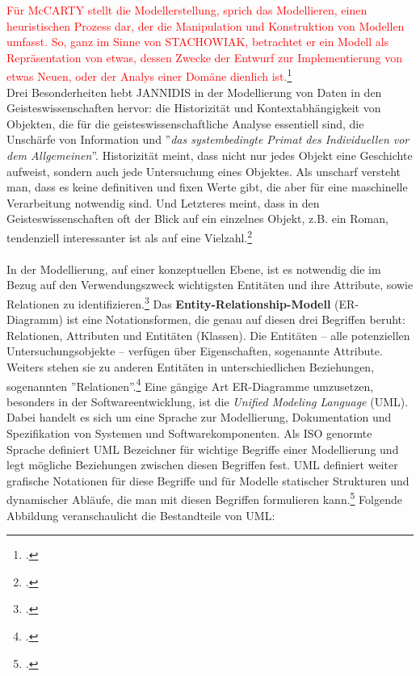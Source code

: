 \documentclass[12pt,a4paper]{article}
\begin{document}
\textcolor{red}{
Für McCARTY stellt die Modellerstellung, sprich das Modellieren, einen heuristischen Prozess dar, der die Manipulation und Konstruktion von Modellen umfasst. So, ganz im Sinne von STACHOWIAK, betrachtet er ein Modell als Repräsentation von etwas, dessen Zwecke der Entwurf zur Implementierung von etwas Neuen, oder der Analys einer Domäne dienlich ist.}\footcite[][S.255]{mccarty2004modeling}
\\
Drei Besonderheiten hebt JANNIDIS in der Modellierung von Daten in den Geisteswissenschaften hervor: die Historizität und Kontextabhängigkeit von Objekten, die für die geisteswissenschaftliche Analyse essentiell sind, die Unschärfe von Information und ''\textit{das systembedingte Primat des Individuellen vor dem Allgemeinen}''. Historizität meint, dass nicht nur jedes Objekt eine Geschichte aufweist, sondern auch jede Untersuchung eines Objektes. Als unscharf versteht man, dass es keine definitiven und fixen Werte gibt, die aber für eine maschinelle Verarbeitung notwendig sind. Und Letzteres meint, dass in den Geisteswissenschaften oft der Blick auf ein einzelnes Objekt, z.B. ein Roman, tendenziell interessanter ist als auf eine Vielzahl.\footcite[][S.106-108]{jannidis2017grundlagen}
\\
\\
In der Modellierung, auf einer konzeptuellen Ebene, ist es notwendig die im Bezug auf den Verwendungszweck wichtigsten Entitäten und ihre Attribute, sowie Relationen zu identifizieren.\footcite[][S.102-104]{jannidis2017grundlagen} Das \textbf{Entity-Relationship-Modell} (ER-Diagramm) ist eine Notationsformen, die genau auf diesen drei Begriffen beruht: Relationen, Attributen und Entitäten (Klassen). Die Entitäten -- alle potenziellen Untersuchungsobjekte -- verfügen über Eigenschaften, sogenannte Attribute. Weiters stehen sie zu anderen Entitäten in unterschiedlichen Beziehungen, sogenannten ''Relationen''.\footcite{chen1976entity} Eine gängige Art ER-Diagramme umzusetzen, besonders in der Softwareentwicklung, ist die \textit{Unified Modeling Language} (UML). Dabei handelt es sich um eine Sprache zur Modellierung, Dokumentation und Spezifikation von Systemen und Softwarekomponenten. Als ISO genormte Sprache definiert UML Bezeichner für wichtige Begriffe einer Modellierung und legt mögliche Beziehungen zwischen diesen Begriffen fest. UML definiert weiter grafische Notationen für diese Begriffe und für Modelle statischer Strukturen und dynamischer Abläufe, die man mit diesen Begriffen formulieren kann.\footcite{rumbaugh2004unified} Folgende Abbildung veranschaulicht die Bestandteile von UML:
\end{document}
